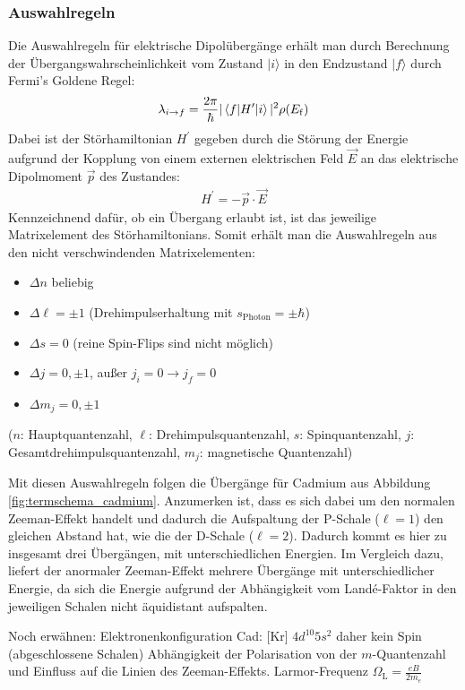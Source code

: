 \documentclass[11pt, a4paper]{article}
\begin{document}
\subsubsection{Auswahlregeln}
\label{sec:auswahlregeln}
Die Auswahlregeln für elektrische Dipolübergänge erhält man durch Berechnung der Übergangswahrscheinlichkeit vom Zustand $|i\rangle$ in den Endzustand $|f\rangle$ durch Fermi's Goldene Regel:
\begin{align}
	\lambda_{i\rightarrow f} = \frac{2 \pi}{\hbar} | \braket{f|H^\prime|i} |^2 \rho(E_\mathrm{f})
\end{align}
Dabei ist der Störhamiltonian $H^\prime$ gegeben durch die Störung der Energie aufgrund der Kopplung von einem externen elektrischen Feld $\vec{E}$ an das elektrische Dipolmoment $\vec{p}$ des Zustandes:
\begin{align}
	H^\prime = - \vec{p} \cdot \vec{E}
\end{align}
Kennzeichnend dafür, ob ein Übergang erlaubt ist, ist das jeweilige Matrixelement des Störhamiltonians.
Somit erhält man die Auswahlregeln aus den nicht verschwindenden Matrixelementen:
\begin{itemize}
	\item $\Delta n$ beliebig
	\item $\Delta \ell = \pm 1$ \quad (Drehimpulserhaltung mit $s_\mathrm{Photon} = \pm \hbar$)
	\item $\Delta s = 0$ \quad (reine Spin-Flips sind nicht möglich)
	\item $\Delta j = 0, \pm 1$, außer $j_i=0 \rightarrow j_f=0$
	\item $\Delta m_j = 0, \pm 1$
\end{itemize}
($n$: Hauptquantenzahl, $\ell$: Drehimpulsquantenzahl, $s$: Spinquantenzahl, $j$: Gesamtdrehimpulsquantenzahl, $m_j$: magnetische Quantenzahl)

Mit diesen Auswahlregeln folgen die Übergänge für Cadmium aus Abbildung \ref{fig:termschema_cadmium}.
Anzumerken ist, dass es sich dabei um den normalen Zeeman-Effekt handelt und dadurch die Aufspaltung der P-Schale ($\ell = 1$) den gleichen Abstand hat, wie die der D-Schale ($\ell = 2$).
Dadurch kommt es hier zu insgesamt drei Übergängen, mit unterschiedlichen Energien.
Im Vergleich dazu, liefert der anormaler Zeeman-Effekt mehrere Übergänge mit unterschiedlicher Energie, da sich die Energie aufgrund der Abhängigkeit vom Landé-Faktor in den jeweiligen Schalen nicht äquidistant aufspalten.

Noch erwähnen:
Elektronenkonfiguration Cad: [Kr] $4d^{10} 5s^2$ daher kein Spin (abgeschlossene Schalen)
 Abhängigkeit der Polarisation von der $m$-Quantenzahl und Einfluss auf die Linien des Zeeman-Effekts. Larmor-Frequenz $\Omega_\mathrm{L} = \frac{e B}{2 m_e}$
\end{document}
